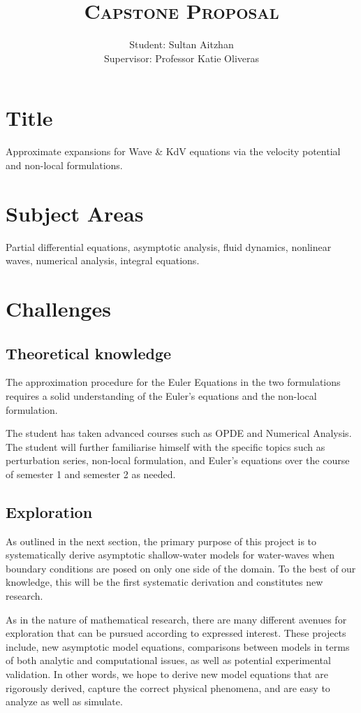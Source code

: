 \documentclass[10pt, oneside, a4paper]{article}
\author{
    Student: Sultan Aitzhan\\
    Supervisor: Professor Katie Oliveras
    }
\title{\textsc{Capstone Proposal}}
\date{\vspace{-5ex}}
\begin{document}
\maketitle

\thispagestyle{fancy}


\section{Title}
Approximate expansions for Wave \& KdV equations via the velocity potential and non-local formulations.

\section{Subject Areas}
Partial differential equations, asymptotic analysis, fluid dynamics, nonlinear waves, numerical analysis, integral equations.

\section{Challenges}
\subsection{Theoretical knowledge}
The approximation procedure for the Euler Equations in the two formulations requires a solid understanding of the Euler's equations and the non-local formulation. 

The student has taken advanced courses such as OPDE and Numerical Analysis. The student will further familiarise himself with the specific topics such as perturbation series, non-local formulation, and Euler's equations over the course of semester 1 and semester 2 as needed.

\subsection{Exploration}
As outlined in the next section, the primary purpose of this project is to systematically derive asymptotic shallow-water models for water-waves when boundary conditions are posed on only one side of the domain.  To the best of our knowledge, this will be the first systematic derivation and constitutes new research. 

As in the nature of mathematical research, there are many different avenues for exploration that can be pursued according to expressed interest.  These projects include, new asymptotic model equations, comparisons between models in terms of both analytic and computational issues, as well as potential experimental validation. In other words, we hope to derive new model equations that are rigorously derived, capture the correct physical phenomena, and are easy to analyze as well as simulate.
\end{document}
